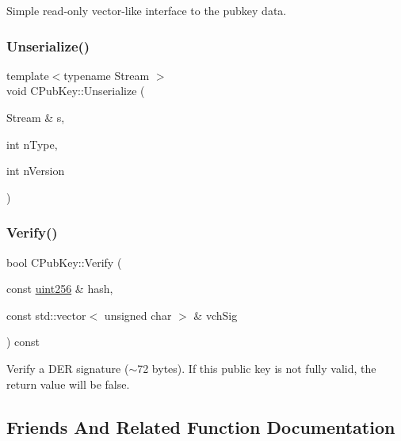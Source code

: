 Simple read-\/only vector-\/like interface to the pubkey data. 

\mbox{\label{class_c_pub_key_a1cfd8e3c711f5298eecdacd5979f6e6c}} 
\subsubsection{\texorpdfstring{Unserialize()}{Unserialize()}}
{\footnotesize\ttfamily template$<$typename Stream $>$ \\
void C\+Pub\+Key\+::\+Unserialize (\begin{DoxyParamCaption}\item[{Stream \&}]{s,  }\item[{int}]{n\+Type,  }\item[{int}]{n\+Version }\end{DoxyParamCaption})\hspace{0.3cm}{\ttfamily [inline]}}

\mbox{\label{class_c_pub_key_a5b3fef213b227394ca9d0a1e3baa957e}} 
\subsubsection{\texorpdfstring{Verify()}{Verify()}}
{\footnotesize\ttfamily bool C\+Pub\+Key\+::\+Verify (\begin{DoxyParamCaption}\item[{const \mbox{\hyperlink{classuint256}{uint256}} \&}]{hash,  }\item[{const std\+::vector$<$ unsigned char $>$ \&}]{vch\+Sig }\end{DoxyParamCaption}) const}

Verify a D\+ER signature ($\sim$72 bytes). If this public key is not fully valid, the return value will be false. 

\subsection{Friends And Related Function Documentation}
\mbox{\label{class_c_pub_key_af660fd5a8d213211dfff37a2296d09e1}} 
